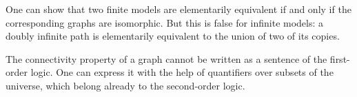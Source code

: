 

\setcounter{section}{3}
\setcounter{subsection}{1}
\setcounter{dfn}{8}

\begin{rem}
One can show that two finite models are elementarily equivalent if and only if the corresponding graphs are isomorphic.
But this is false for infinite models: a doubly infinite path is elementarily equivalent to the union of two of its copies.

The connectivity property of a graph cannot be written as a sentence of the first-order logic.
One can express it with the help of quantifiers over subsets of the universe, which belong already to the second-order logic.
\end{rem}


